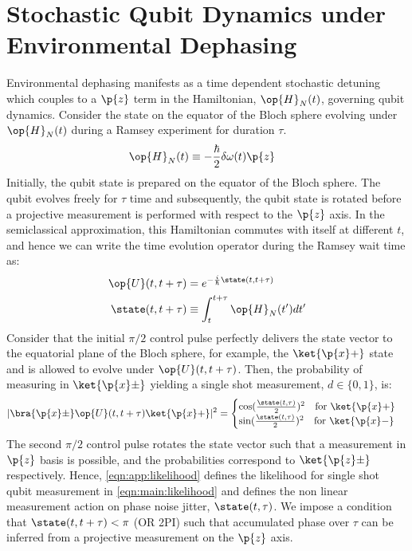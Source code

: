 \section{Stochastic Qubit Dynamics under Environmental Dephasing \label{sec:app:setup}}
Environmental dephasing manifests as a time dependent stochastic detuning which couples to a $\p{z}$ term in the Hamiltonian, $\op{H}_{N} (t)$, governing qubit dynamics. Consider the state on the equator of the Bloch sphere evolving under $\op{H}_{N} (t)$ during a Ramsey experiment for duration $\tau$. 
\begin{align} 
\op{H}_{N}(t) & \equiv -\frac{\hbar}{2}\delta\omega(t)\p{z}
\end{align}
Initially, the qubit state is prepared on the equator of the Bloch sphere. The qubit evolves freely for $\tau$ time and subsequently, the qubit state is rotated before a projective measurement is performed with respect to the $\p{z}$ axis. In the semiclassical approximation, this Hamiltonian commutes with itself at different $t$, and hence we can write the time evolution operator during the Ramsey wait time as:
\begin{align}
\op{U}(t, t + \tau) & = e^{-\frac{i}{\hbar} \state(t, t + \tau)} \\
\state(t, t + \tau) & \equiv \int_{t}^{t + \tau} \op{H}_{N} (t') dt' \label{eqn:app:phases}
\end{align}
Consider that the initial $\pi/2$ control pulse perfectly delivers the state vector to the equatorial plane of the Bloch sphere, for example, the  $\ket{\p{x} +}$ state and is allowed to evolve under $\op{U}(t, t + \tau)$. Then, the probability of measuring in $\ket{\p{x} \pm}$ yielding a single shot measurement, $d \in \{0, 1\}$, is:
\begin{align} 
|\bra{\p{x} \pm} \op{U}(t, t + \tau) \ket{\p{x} +}|^2= \begin{cases} \cos(\frac{\state(t, \tau)}{2})^2 \quad \text{for $ \ket{\p{x} +}$} \\   \sin(\frac{\state(t, \tau)}{2})^2  \quad \text{for $ \ket{\p{x} -}$} \end{cases} \label{eqn:app:likelihood}
\end{align}
The second $\pi/2$ control pulse rotates the state vector such that a measurement in $\p{z}$ basis is possible, and the probabilities correspond to $\ket{\p{z} \pm}$ respectively. Hence, \cref{eqn:app:likelihood} defines the likelihood for single shot qubit measurement in \cref{eqn:main:likelihood} and defines the non linear measurement action on phase noise jitter, $\state(t, \tau)$. 
We impose a condition that $\state(t, t + \tau) < \pi$ (OR 2PI) such that accumulated phase over $\tau$ can be inferred from a projective measurement on the $\p{z}$ axis. 

